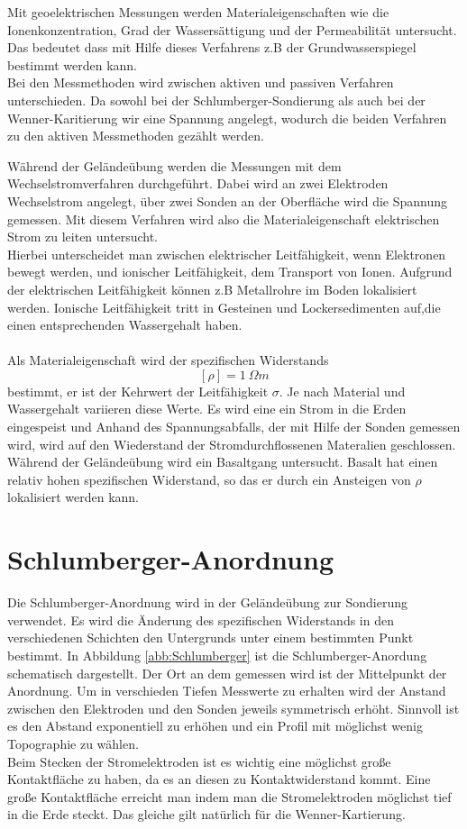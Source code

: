 
Mit geoelektrischen Messungen werden Materialeigenschaften wie die Ionenkonzentration, Grad der Wassersättigung und der Permeabilität untersucht. 
Das bedeutet dass mit Hilfe dieses Verfahrens z.B der Grundwasserspiegel bestimmt werden kann. \\
Bei den Messmethoden wird zwischen aktiven und passiven Verfahren unterschieden.  Da sowohl bei der Schlumberger-Sondierung als auch bei der Wenner-Karitierung wir eine Spannung angelegt, wodurch die beiden Verfahren zu den aktiven Messmethoden gezählt werden.



Während der Geländeübung werden die Messungen mit dem Wechselstromverfahren durchgeführt. Dabei wird an zwei Elektroden Wechselstrom angelegt,
über zwei Sonden an der Oberfläche wird die Spannung gemessen. Mit diesem Verfahren wird also die Materialeigenschaft elektrischen Strom zu leiten untersucht. \\
Hierbei unterscheidet man zwischen elektrischer Leitfähigkeit, wenn Elektronen bewegt werden, und ionischer Leitfähigkeit, dem Transport von Ionen. 
Aufgrund der elektrischen Leitfähigkeit können z.B Metallrohre im Boden lokalisiert werden. Ionische Leitfähigkeit tritt in Gesteinen und Lockersedimenten auf,die einen entsprechenden Wassergehalt haben. \\
\\
Als Materialeigenschaft wird der spezifischen Widerstands $$[\rho] = \SI{1}{\Omega m}$$ bestimmt, er ist der Kehrwert der Leitfähigkeit $\sigma$. Je nach Material und Wassergehalt variieren diese Werte. Es wird eine ein Strom in die Erden eingespeist und Anhand des Spannungsabfalls, der mit Hilfe der Sonden gemessen wird, wird auf den Wiederstand der Stromdurchflossenen Materalien geschlossen. Während der Geländeübung wird ein Basaltgang untersucht. Basalt hat einen relativ hohen spezifischen Widerstand, so das er durch ein Ansteigen  von $ \rho$ lokalisiert werden kann.

\section{Schlumberger-Anordnung}
Die Schlumberger-Anordnung wird in der Geländeübung zur Sondierung verwendet. Es wird die Änderung des spezifischen Widerstands in den verschiedenen Schichten den Untergrunds unter einem bestimmten Punkt bestimmt. In Abbildung \ref{abb:Schlumberger} ist die Schlumberger-Anordung schematisch dargestellt. Der Ort an dem gemessen wird ist der Mittelpunkt der Anordnung. Um in verschieden Tiefen Messwerte zu erhalten wird der Anstand zwischen den Elektroden und den Sonden jeweils symmetrisch erhöht. Sinnvoll ist es den Abstand exponentiell zu erhöhen und ein Profil mit möglichst wenig Topographie zu wählen.\\
Beim Stecken der Stromelektroden ist es wichtig eine möglichst große Kontaktfläche zu haben, da es an diesen zu Kontaktwiderstand kommt. Eine große Kontaktfläche erreicht man indem man die Stromelektroden möglichst tief in die Erde steckt. 
Das gleiche gilt natürlich für die Wenner-Kartierung.


